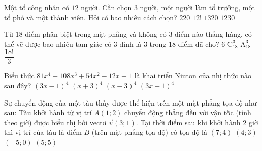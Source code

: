 \begin{ex}%
Một tổ công nhân có $ 12$ người. Cần chọn $ 3$ người, một người làm tổ trưởng, một tổ phó và một thành viên. Hỏi có bao nhiêu cách chọn?
\choice
{$ 220$}
{$ 12!$}
{\True $ 1320$}
{$ 1230$}
\end{ex}

\begin{ex}%
Từ $18$ điểm phân biệt trong mặt phẳng và không có $3$ điểm nào thẳng hàng, có thể vẽ được bao nhiêu tam giác có $3$ đỉnh là $3$ trong $18$ điểm đã cho?
\choice
{$6$}
{\True $\mathrm{C}_{18}^3$}
{$\mathrm{A}_{18}^3$}
{$\dfrac{18!}{3}$}
\end{ex}

\begin{ex}%
Biểu thức $81x^4-108x^3+54x^2-12x+1$ là khai triển Niuton của nhị thức nào sau đây?
\choice
{\True $(3x-1)^4$}
{$(x+3)^4$}
{$(x-3)^4$}
{$(3x+1)^4$}
\end{ex}

\begin{ex}%
Sự chuyển động của một tàu thủy được thể hiện trên một mặt phẳng tọa độ như sau: Tàu khởi hành từ vị trí $A(1;2)$ chuyển động thẳng đều với vận tốc (tính theo giờ) được biểu thị bởi vectơ $\overrightarrow{v}(3;1)$. Tại thời điểm sau khi khởi hành $2$ giờ thì vị trí của tàu là điểm $B$ (trên mặt phẳng tọa độ) có tọa độ là
\choice
{\True $(7;4)$}
{$(4;3)$}
{$(-5;0)$}
{$(5;5)$}
\end{ex}

